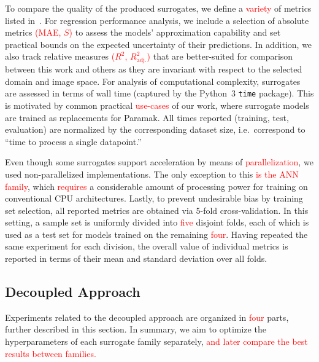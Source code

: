 To compare the quality of the produced surrogates, we define a \textcolor{red}{variety} of metrics listed
in~. For regression performance analysis, we include a
selection of absolute metrics \textcolor{red}{(MAE, $S$)} to assess the models' approximation capability
and set practical bounds on the expected uncertainty of their predictions. In addition, we also track
relative measures \textcolor{red}{($R^2$, $R^2_\text{adj.}$)} that are better-suited for comparison between this work and others as
they are invariant with respect to the selected domain and image space.
For analysis of computational complexity, surrogates are assessed in terms of wall
time (captured by the Python~3 \texttt{time} package). This is motivated by common practical \textcolor{red}{use-cases} of our work, where surrogate models are trained as replacements for
Paramak. All times reported (training, test, evaluation) are
normalized by the corresponding dataset size, i.e.~correspond to ``time to
process a single datapoint.''

Even though some surrogates support acceleration by means of \textcolor{red}{parallelization}, we
used non-parallelized implementations. The only exception to this \textcolor{red}{is the ANN family},
which \textcolor{red}{requires} a considerable amount of processing power for training on
conventional CPU architectures. Lastly, to prevent undesirable bias by training
set selection, all reported metrics are obtained via 5-fold cross-validation.
In this setting, a sample set is uniformly divided into \textcolor{red}{five} disjoint folds, each of which
is used as a test set for models trained on the remaining \textcolor{red}{four}. Having repeated the
same experiment for each division, the overall value of individual metrics is reported in terms of their mean and standard deviation over all folds.



\subsection{Decoupled Approach}\label{sec:experiment-methodology}

Experiments related to the decoupled approach are organized in \textcolor{red}{four} parts,
further described in this section. In summary, we aim to optimize the hyperparameters of
each surrogate family separately, \textcolor{red}{and later compare the best results between
families.}

